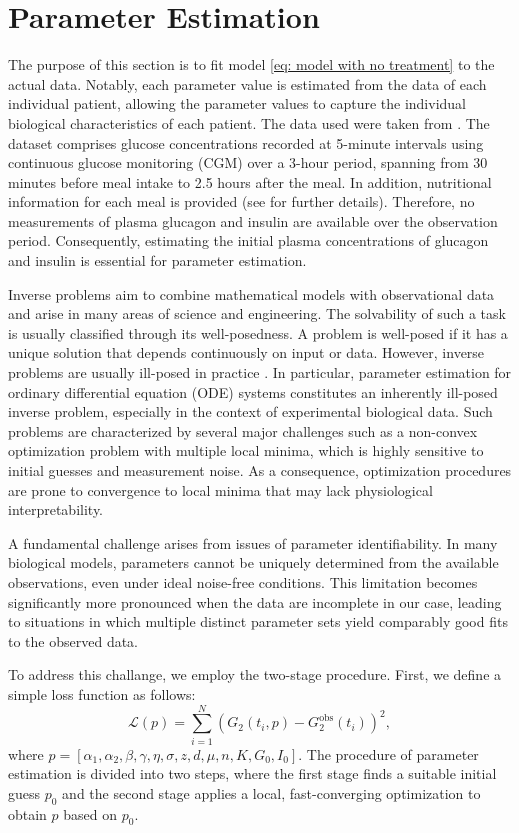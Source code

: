 \documentclass[a4paper,fleqn]{cas-sc}
\numberwithin{equation}{section}
\numberwithin{equation}{section}
\newcommand{\1}{\boldsymbol{1}}
\newcommand{\0}{\boldsymbol{0}}
\begin{document}
\section{Parameter Estimation}
The purpose of this section is to fit model \eqref{eq: model with no treatment} to the actual data. Notably, each parameter value is estimated from the data of each individual patient, allowing the parameter values to capture the individual biological characteristics of each patient. The data used were taken from \cite{Hall2018Glucotypes}. The dataset comprises glucose concentrations recorded at 5-minute intervals using continuous glucose monitoring (CGM) over a 3-hour period, spanning from 30 minutes before meal intake to 2.5 hours after the meal. In addition, nutritional information for each meal is provided (see \cite{Hall2018Glucotypes} for further details).  Therefore, no measurements of plasma glucagon and insulin are available over the observation period. Consequently, estimating the initial plasma concentrations of glucagon and insulin is essential for parameter estimation.

Inverse problems aim to combine mathematical models with observational data and arise in many areas of science and engineering. The solvability of such a task is usually classified through its well-posedness. A problem is well-posed if it has a unique solution that depends continuously on input or data. However, inverse problems are usually ill-posed in practice \cite{Latz2023BayesianWellPosed}. In particular, parameter estimation for ordinary differential equation (ODE) systems constitutes an inherently ill-posed inverse problem, especially in the context of experimental biological data. Such problems are characterized by several major challenges such as a non-convex optimization problem with multiple local minima, which is highly sensitive to initial guesses and measurement noise. As a consequence, optimization procedures are prone to convergence to local minima that may lack physiological interpretability.

A fundamental challenge arises from issues of parameter identifiability. In many biological models, parameters cannot be uniquely determined from the available observations, even under ideal noise-free conditions. This limitation becomes significantly more pronounced when the data are incomplete in our case, leading to situations in which multiple distinct parameter sets yield comparably good fits to the observed data.

To address this challange, we employ the two-stage procedure. First, we define a simple loss function as follows:
    \[
    \mathcal{L} (p) = \displaystyle\sum_{i=1}^N \left(G_2(t_i,p) - G_2^{\text{obs}}(t_i)\right)^2,
    \]
where $p = [\alpha_1, \alpha_2, \beta, \gamma, \eta, \sigma, z, d, \mu, n, K, G_0, I_0]$. The procedure of parameter estimation is divided into two steps, where the first stage finds a suitable initial guess $p_0$ and the second stage applies a local, fast-converging optimization to obtain $p$ based on $p_0$. 
\end{document}
